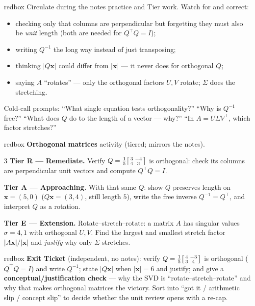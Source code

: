 \documentclass[10pt]{article}
\newcommand{\xx}{\mathbf{x}}
\newcommand{\T}{^{\top}}
\begin{document}
\begin{skillbox}{redbox}
Circulate during the notes practice and Tier work. Watch for and correct:
\begin{itemize}[leftmargin=1.2em, nosep]
  \item checking only that columns are perpendicular but forgetting they must also be \emph{unit} length (both are needed for $Q\T Q=I$);
  \item writing $Q^{-1}$ the long way instead of just transposing;
  \item thinking $|Q\xx|$ could differ from $|\xx|$ --- it never does for orthogonal $Q$;
  \item saying $A$ ``rotates'' --- only the orthogonal factors $U,V$ rotate; $\Sigma$ does the stretching.
\end{itemize}
Cold-call prompts: ``What single equation tests orthogonality?'' ``Why is $Q^{-1}$ free?'' ``What does $Q$ do
to the length of a vector --- why?'' ``In $A=U\Sigma V\T$, which factor stretches?''
\end{skillbox}

\begin{skillbox}{redbox}
\textbf{Orthogonal matrices} activity (tiered; mirrors the notes).
\begin{multicols}{3}
\textbf{Tier R --- Remediate.} Verify $Q=\tfrac15\begin{bsmallmatrix} 3 & -4\\ 4 & 3 \end{bsmallmatrix}$ is
orthogonal: check its columns are perpendicular unit vectors and compute $Q\T Q=I$.

\columnbreak
\textbf{Tier A --- Approaching.} With that same $Q$: show $Q$ preserves length on $\xx=(5,0)$ ($Q\xx=(3,4)$,
still length $5$), write the free inverse $Q^{-1}=Q\T$, and interpret $Q$ as a rotation.

\columnbreak
\textbf{Tier E --- Extension.} Rotate--stretch--rotate: a matrix $A$ has singular values $\sigma=4,1$ with
orthogonal $U,V$. Find the largest and smallest stretch factor $|A\xx|/|\xx|$ and \emph{justify} why only
$\Sigma$ stretches.
\end{multicols}
\end{skillbox}

\begin{skillbox}{redbox}
\textbf{Exit Ticket} (independent, no notes): verify $Q=\tfrac15\begin{bsmallmatrix} 4 & -3\\ 3 & 4 \end{bsmallmatrix}$
is orthogonal ($Q\T Q=I$) and write $Q^{-1}$; state $|Q\xx|$ when $|\xx|=6$ and justify; and give a
\textbf{conceptual/justification check} --- why the SVD is ``rotate--stretch--rotate'' and why that makes
orthogonal matrices the victory. Sort into ``got it / arithmetic slip / concept slip'' to decide whether the
unit review opens with a re-cap.
\end{skillbox}
\end{document}
